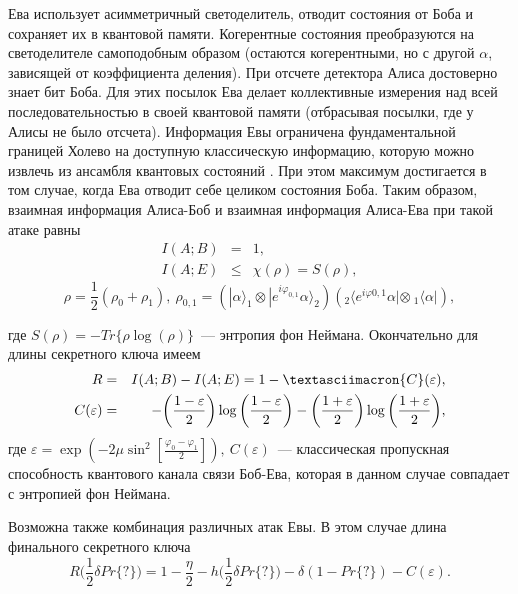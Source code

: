 Ева использует асимметричный светоделитель, отводит состояния от Боба и сохраняет их в квантовой памяти. Когерентные состояния преобразуются на светоделителе самоподобным образом (остаются когерентными, но с другой $\alpha$, зависящей от коэффициента деления). 
При отсчете детектора Алиса достоверно знает бит Боба. Для этих посылок Ева делает коллективные измерения над всей последовательностью в своей квантовой памяти (отбрасывая посылки, где у Алисы не было отсчета).
Информация Евы ограничена фундаментальной границей Холево на доступную классическую информацию, которую можно извлечь из ансамбля квантовых состояний \cite{holevo2002Introtoquathe}. При этом максимум достигается в том случае, когда Ева отводит себе целиком состояния Боба. Таким образом, взаимная информация Алиса-Боб и взаимная информация Алиса-Ева при такой атаке равны
\begin{eqnarray}
  I(A;B) &=& 1, \nonumber \\ 
  I(A;E) &\leq& \chi(\rho) = S(\rho),  
\end{eqnarray}
\begin{equation}
  \rho = \frac{1}{2}(\rho_0 + \rho_1),~
  \rho_{0,1} = (|\alpha \rangle_1 \otimes | e^{i\varphi_{0,1}}\alpha\rangle_2)
	      ({}_2\langle e^{i\varphi{0,1}}\alpha | \otimes~{}_1 \langle \alpha |),
\end{equation}

где $S(\rho) = -Tr\{\rho \log (\rho)\}$~--- энтропия фон Неймана.
Окончательно для длины секретного ключа имеем
\begin{eqnarray}
  R &=& I(A;B) - I(A;E) = 1 - \textasciimacron{C}(\varepsilon),\nonumber\\  
  C(\varepsilon) &=& -\bigg(\frac{1-\varepsilon}{2}\bigg)\log\bigg(\frac{1-\varepsilon}{2}\bigg) - \bigg(\frac{1+\varepsilon}{2}\bigg)\log\bigg(\frac{1+\varepsilon}{2}\bigg),
\end{eqnarray}
где $\varepsilon = \exp(-2\mu\sin^2[\frac{\varphi_0 - \varphi_1}{2}]),~C(\varepsilon)$~--- классическая пропускная способность квантового канала связи Боб-Ева, которая в данном случае совпадает с энтропией фон Неймана.

Возможна также комбинация различных атак Евы. В этом случае длина финального секретного ключа
\begin{equation}
  R\bigg(\frac{1}{2}\delta Pr\{?\}\bigg) = 1 - \frac{\eta}{2} - h\bigg(\frac{1}{2}\delta Pr\{?\}\bigg) - \delta(1 - Pr\{?\}) - C(\varepsilon).
\end{equation}

